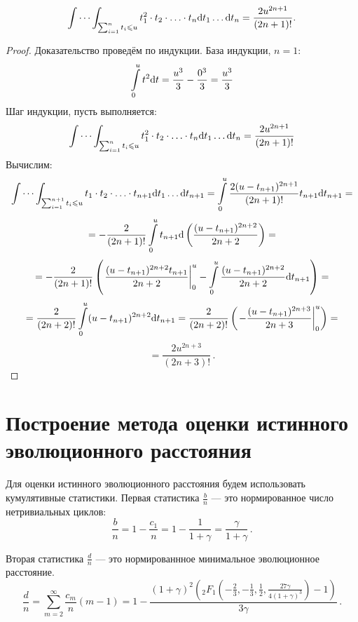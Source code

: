 \begin{lemma}
$$
    \idotsint_{ \sum_{i=1}^{n} t_i \leq u} {
        t_1^2 \cdot t_2 \cdot \ldots \cdot t_{n}
        \mathrm{d} t_1 \ldots \mathrm{d} t_{n}
    } =
    \frac {2 u ^ {2n + 1}} {(2n + 1)!}
    \label{subint2}.
$$
\end{lemma}
\begin{proof}
Доказательство проведём по индукции. База индукции, $n = 1$:
$$
    \intop_0^u {t^2 \mathrm{d} t} =
    \frac {u ^ 3} 3 - \frac {0 ^ 3} 3 =
    \frac {u ^ 3} 3
$$
Шаг индукции, пусть выполняется:
$$
    \idotsint_{ \sum_{i=1}^{n} t_i \leq u} {
        t_1^2 \cdot t_2 \cdot \ldots \cdot t_{n}
        \mathrm{d} t_1 \ldots \mathrm{d} t_{n}
    } =
    \frac {2 u ^ {2n + 1}} {(2n + 1)!}
$$
Вычислим:
$$
    \idotsint_{ \sum_{i=1}^{n+1} t_i \leq u} {
        t_1 \cdot t_2 \cdot \ldots \cdot t_{n+1}
        \mathrm{d} t_1 \ldots \mathrm{d} t_{n+1}
    } =
    \intop_{0}^{u}
    \frac {2 (u - t_{n+1})^{2n + 1}} {(2n + 1)!} t_{n+1}
    \mathrm{d} t_{n+1}
    =
$$ $$
    = - \frac 2 {(2n + 1)!}
    \intop_{0}^{u}
    t_{n+1} \mathrm{d} \left(
        \frac {(u - t_{n+1})^{2n + 2}} {2n + 2}
    \right)
    =
$$ $$
    =
    - \frac 2 {(2n + 1)!}
    \left( \left.
        \frac {(u - t_{n+1})^{2n + 2} t_{n+1}} {2n + 2} \right|_0^u
        - \intop_{0}^{u}
        \frac {(u - t_{n+1}) ^ {2n+2}} {2n+2}
        \mathrm{d} t_{n+1}
    \right)
    = $$ $$ =
    \frac 2 {(2n + 2)!}
    \intop_{0}^{u}
    (u - t_{n+1}) ^ {2n+2}
    \mathrm{d} t_{n+1}
    =
    \frac 2 {(2n + 2)!}
    \left( \left.
        - \frac
        {(u - t_{n+1}) ^ {2n+3}}
        {2n + 3}
        \right|_0^u
    \right)
    = $$ $$ =
    \frac {2 u ^ {2n+3}} {(2n + 3)!} \, .%
$$
\end{proof}


\section{Построение метода оценки истинного эволюционного расстояния}
Для оценки истинного эволюционного расстояния будем использовать кумулятивные статистики.
Первая статистика $\frac b n$ --- это нормированное число нетривиальных циклов:
$$\frac b n = 1 - \frac {c_1} n = 1 - \frac 1 {1 + \gamma} = \frac \gamma {1 + \gamma} \, .%
$$

Вторая статистика $\frac d n$ --- это нормированнное минимальное эволюционное расстояние.
$$\frac d n = \sum_{m=2}^{\infty} \frac {c_m} n (m-1) =
1 - \frac
{(1 + \gamma)^2 ({}_2F_1\left(-\frac 2 3, -\frac 1 3, \frac 1 2, \frac {27 \gamma} {4 (1 + \gamma)^3}\right) - 1)}
{3 \gamma} \, .%
$$

